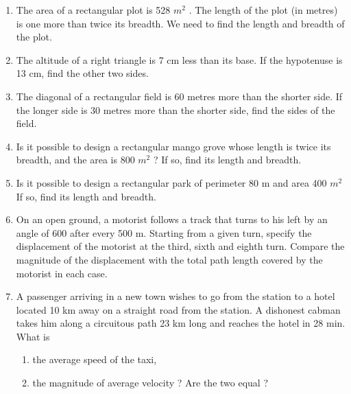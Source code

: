 \begin{enumerate}[label=\arabic*.,ref=\thesubsection.\theenumi]
\item The area of a rectangular plot is 528 $m^2$
. The length of the plot (in metres) is one more than twice its breadth. We need to find the length and breadth of the plot.
%
\item  The altitude of a right triangle is 7 cm less than its base. If the hypotenuse is 13 cm, find the other two sides.
%
\item The diagonal of a rectangular field is 60 metres more than the shorter side. If the longer side is 30 metres more than the shorter side, find the sides of the field.
\item Is it possible to design a rectangular mango grove whose length is twice its breadth, and the area is 800 $m^2$
? If so, find its length and breadth.
%
\item Is it possible to design a rectangular park of perimeter 80 m and area 400 $m^2$ If so, find  its length and breadth.
\item On an open ground, a motorist follows a track that turns to his left by an angle of 600 after every 500 m. Starting from a given turn, specify the displacement of the motorist at the third, sixth and eighth turn. Compare the magnitude of the displacement with the total path length covered by the motorist in each case.
\item A passenger arriving in a new town wishes to go from the station to a hotel located 10 km away on a straight road from the station. A dishonest cabman takes him along a circuitous path 23 km long and reaches the hotel in 28 min. What is 
\begin{enumerate}
\item  the average speed of the taxi, 
\item  the magnitude of average velocity ? Are the two equal ?


\end{enumerate}
\end{enumerate}
